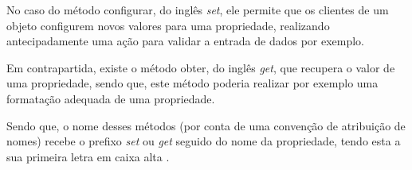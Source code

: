 No caso do método configurar, do inglês \textit{set}, ele permite que os
clientes de um objeto configurem novos valores para uma propriedade, realizando 
antecipadamente uma ação para validar a entrada de dados por exemplo.

Em contrapartida, existe o método obter, do inglês \textit{get}, que recupera o
valor de uma propriedade, sendo que, este método poderia realizar por exemplo uma 
formatação adequada de uma propriedade.

Sendo que, o nome desses métodos (por conta de uma convenção de atribuição de
nomes) recebe o prefixo \textit{set} ou \textit{get} seguido do nome da
propriedade, tendo esta a sua primeira letra em caixa alta \cite{javaComoProgramar}.